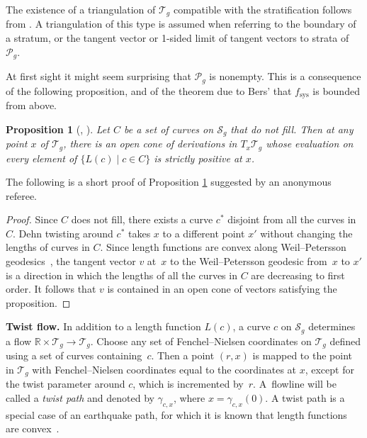 \documentclass[pdftex]{sigma}
\numberwithin{equation}{section}
\newtheorem{Proposition}[Theorem]{Proposition}
\begin{document}
The existence of a triangulation of $\mathcal{T}_{g}$ compatible with the stratification follows from \cite{Lojasiewicz1964}. A triangulation of this type is assumed when referring to the boundary of a stratum, or the tangent vector or 1-sided limit of tangent vectors to strata of $\mathcal{P}_{g}$.

At first sight it might seem surprising that $\mathcal{P}_{g}$ is nonempty. This is a consequence of the following proposition, and of the theorem due to Bers' \cite{Bers1985} that $f_{\mathrm{sys}}$ is bounded from above.

\begin{Proposition}[{\cite[Proposition 0.1]{Thurston}, \cite[Lemma 4]{Bers}}]
\label{Thurstonprop}
Let $C$ be a set of curves on $\mathcal{S}_{g}$ that do not fill. Then at any point $x$ of $\mathcal{T}_{g}$, there is an open cone of derivations in $T_{x}\mathcal{T}_{g}$ whose evaluation on every element of $\{L(c) \mid c\in C\}$ is strictly positive at $x$.
\end{Proposition}

The following is a short proof of Proposition \ref{Thurstonprop} suggested by an anonymous referee.

\begin{proof}
Since $C$ does not fill, there exists a curve $c^{*}$ disjoint from all the curves in $C$. Dehn twisting around $c^{*}$ takes $x$ to a different point $x'$ without changing the lengths of curves in $C$. Since length functions are convex along Weil--Petersson geodesics~\cite{Wolpert}, the tangent vector $v$ at~$x$ to the Weil--Petersson geodesic from~$x$ to $x'$ is a direction in which the lengths of all the curves in $C$ are decreasing to first order. It follows that $v$ is contained in an open cone of vectors satisfying the proposition.
\end{proof}

\textbf{Twist flow.} In addition to a length function $L(c)$, a curve $c$ on $\mathcal{S}_{g}$ determines a flow $\mathbb{R}\times \mathcal{T}_{g}\rightarrow \mathcal{T}_{g}$. Choose any set of Fenchel--Nielsen coordinates on $\mathcal{T}_{g}$ defined using a set of curves containing~$c$. Then a point $(r,x)$ is mapped to the point in $\mathcal{T}_{g}$ with Fenchel--Nielsen coordinates equal to the coordinates at $x$, except for the twist parameter around $c$, which is incremented by~$r$. A~flowline will be called a \textit{twist path} and denoted by $\gamma_{c, x}$, where $x=\gamma_{c,x}(0)$. A twist path is a special case of an earthquake path, for which it is known that length functions are convex~\cite{Kerckhoff}.
\end{document}
